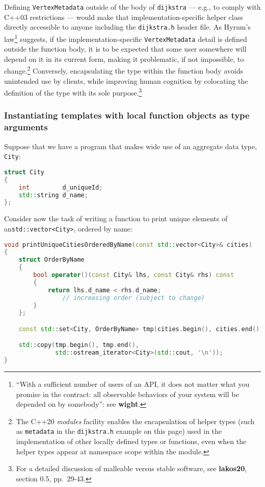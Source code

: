 \noindent Defining \texttt{VertexMetadata} outside of the body of
\texttt{dijkstra} --- e.g., to comply with C++03 restrictions --- would
make that implementation-specific helper class directly accessible to
anyone including the \texttt{dijkstra.h} header file. As Hyrum's
law{\cprotect\footnote{``With a sufficient number
of users of an API, it does not matter what you promise in the
contract: all observable behaviors of your system will be depended on
  by somebody'': see \textbf{wight}.}} suggests, if the
imple\-men\-tation-specific \texttt{VertexMetadata} detail is defined
outside the function body, it is to be expected that some user somewhere
will depend on it in its current form, making it problematic, if not
impossible, to change.\footnote{The C++20 \emph{modules} facility enables the
encapsulation of helper types (such as \texttt{metadata} in the \mbox{\texttt{dijkstra.h}} example on this page) used in
the implementation of other locally defined types or functions, even
when the helper types appear at namespace scope within the module.} Conversely, encapsulating
the type within the function body avoids unintended use by clients,
while improving human cognition by colocating the definition of the
type with its sole purpose.{\cprotect\footnote{For a detailed
  discussion of malleable  versus stable software, see \textbf{{lakos20}},
  section 0.5, pp.~29-43.}}

\subsubsection[Instantiating templates with local function objects as type arguments]{Instantiating templates with local function objects as type arguments}\label{instantiating-templates-with-local-function-objects-as-type-arguments}

Suppose that we have a program that makes wide use of an aggregate data
type, \texttt{City}:

\begin{lstlisting}[language=C++]
struct City
{
    int         d_uniqueId;
    std::string d_name;
};
\end{lstlisting}

\noindent Consider now the task of writing a function to print unique elements of
an\linebreak[4] \texttt{std::vector<City>}, ordered by name:

\begin{lstlisting}[language=C++]
void printUniqueCitiesOrderedByName(const std::vector<City>& cities)
{
    struct OrderByName
    {
        bool operator()(const City& lhs, const City& rhs) const
        {
            return lhs.d_name < rhs.d_name;
                // increasing order (subject to change)
        }
    };

    const std::set<City, OrderByName> tmp(cities.begin(), cities.end());

    std::copy(tmp.begin(), tmp.end(),
              std::ostream_iterator<City>(std::cout, '\n'));
}
\end{lstlisting}

